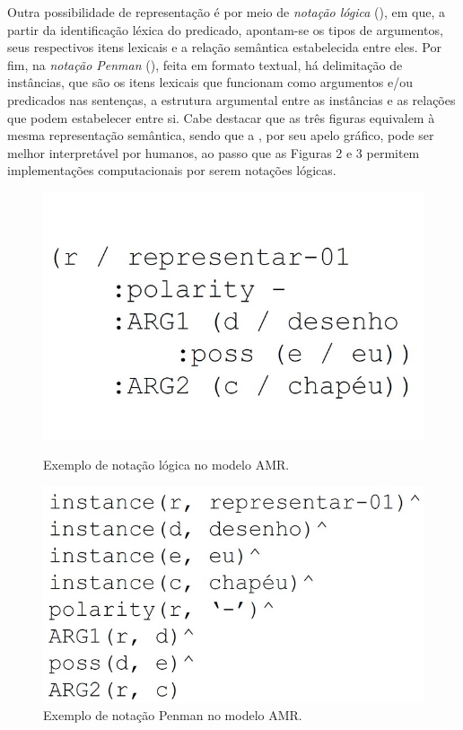 Outra possibilidade de representação é por meio de \emph{notação lógica}
(), em que, a partir da identificação léxica do predicado,
apontam-se os tipos de argumentos, seus respectivos itens lexicais e a
relação semântica estabelecida entre eles. Por fim, na \emph{notação
Penman} (), feita em formato textual, há delimitação de
instâncias, que são os itens lexicais que funcionam como argumentos e/ou
predicados nas sentenças, a estrutura argumental entre as instâncias e
as relações que podem estabelecer entre si. Cabe destacar que as três
figuras equivalem à mesma representação semântica, sendo que a ,
por seu apelo gráfico, pode ser melhor interpretável por humanos, ao
passo que as Figuras 2 e 3 permitem implementações computacionais por
serem notações lógicas.

\begin{figure}[htpb]
\begin{minipage}{.45\textwidth}
  \centering
  \includegraphics[width=\textwidth]{figure02.jpg}
  \caption{Exemplo de notação lógica no modelo AMR.}
  \label{fig-02}
\end{minipage}%
\hfill
\begin{minipage}{.45\textwidth}
  \centering
 \includegraphics[width=\textwidth]{figure03.jpg}
  \caption{Exemplo de notação Penman no modelo AMR.}
  \label{fig-03}
\end{minipage}
\end{figure}

